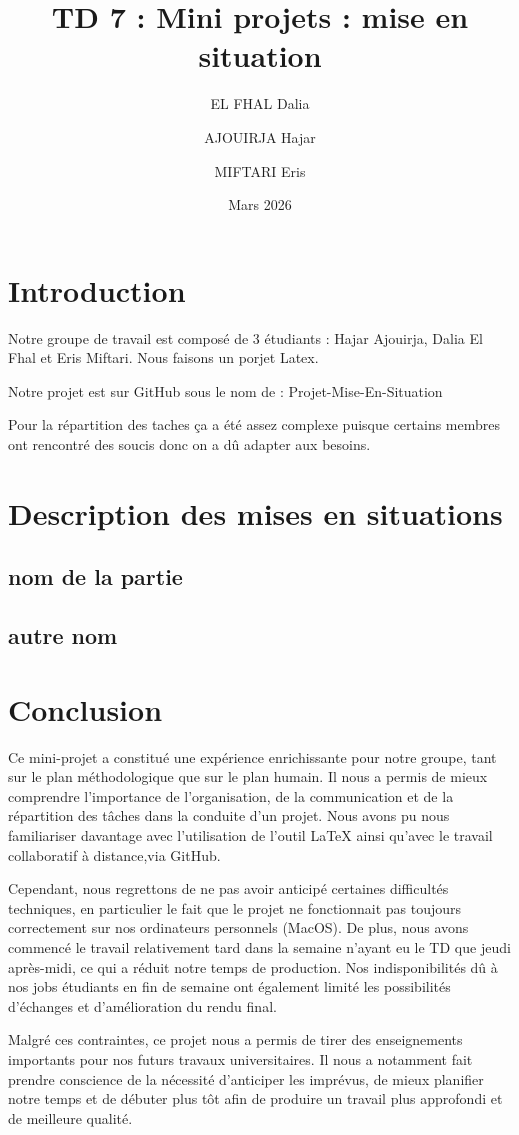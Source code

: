 \documentclass[a4paper,12pt]{article}
\title{TD 7 : Mini projets : mise en situation}
\author{EL FHAL Dalia \and AJOUIRJA Hajar \and MIFTARI Eris}
\date{Mars 2026}
\begin{document}
\section{Introduction}  
Notre groupe de travail est composé de 3 étudiants : Hajar Ajouirja, Dalia El Fhal et Eris Miftari. Nous faisons un porjet Latex.

Notre projet est sur GitHub sous le nom de : Projet-Mise-En-Situation

Pour la répartition des taches ça a été assez complexe puisque certains membres ont rencontré des soucis donc on a dû adapter aux besoins.




\section{Description des mises en situations}
\subsection{nom de la partie}



\subsection{autre nom}












\section{Conclusion}

Ce mini-projet a constitué une expérience enrichissante pour notre groupe, tant sur le plan méthodologique que sur le plan humain. Il nous a permis de mieux comprendre l’importance de l’organisation, de la communication et de la répartition des tâches dans la conduite d’un projet. Nous avons pu nous familiariser davantage avec l’utilisation de l’outil LaTeX ainsi qu’avec le travail collaboratif à distance,via GitHub.

Cependant, nous regrettons de ne pas avoir anticipé certaines difficultés techniques, en particulier le fait que le projet ne fonctionnait pas toujours correctement sur nos ordinateurs personnels (MacOS). De plus, nous avons commencé le travail relativement tard dans la semaine n'ayant eu le TD que jeudi après-midi, ce qui a réduit notre temps de production. Nos indisponibilités dû à nos jobs étudiants en fin de semaine ont également limité les possibilités d’échanges et d’amélioration du rendu final.

Malgré ces contraintes, ce projet nous a permis de tirer des enseignements importants pour nos futurs travaux universitaires. Il nous a notamment fait prendre conscience de la nécessité d’anticiper les imprévus, de mieux planifier notre temps et de débuter plus tôt afin de produire un travail plus approfondi et de meilleure qualité.
\end{document}
